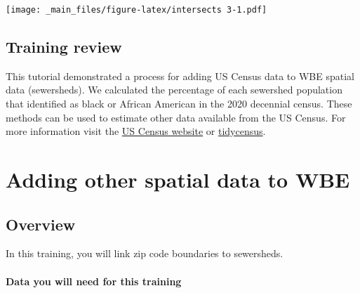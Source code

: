 \documentclass[
]{book}
\newenvironment{Shaded}{\begin{snugshade}}{\end{snugshade}}
\newcommand{\AttributeTok}[1]{\textcolor[rgb]{0.77,0.63,0.00}{#1}}
\newcommand{\CommentTok}[1]{\textcolor[rgb]{0.56,0.35,0.01}{\textit{#1}}}
\newcommand{\FunctionTok}[1]{\textcolor[rgb]{0.00,0.00,0.00}{#1}}
\newcommand{\NormalTok}[1]{#1}
\newcommand{\OtherTok}[1]{\textcolor[rgb]{0.56,0.35,0.01}{#1}}
\newcommand{\SpecialCharTok}[1]{\textcolor[rgb]{0.00,0.00,0.00}{#1}}
\newcommand{\StringTok}[1]{\textcolor[rgb]{0.31,0.60,0.02}{#1}}
\begin{document}
\begin{Shaded}
\end{Shaded}

\texttt{[image: \_main\_files/figure-latex/intersects 3-1.pdf]}

\hypertarget{training-review-1}{%
\section{Training review}\label{training-review-1}}

This tutorial demonstrated a process for adding US Census data to WBE spatial data (sewersheds). We calculated the percentage of each sewershed population that identified as black or African American in the 2020 decennial census. These methods can be used to estimate other data available from the US Census. For more information visit the \href{https://www.census.gov/}{US Census website} or \href{https://walker-data.com/tidycensus/}{tidycensus}.

\hypertarget{adding-other-spatial-data-to-wbe}{%
\chapter{Adding other spatial data to WBE}\label{adding-other-spatial-data-to-wbe}}

\hypertarget{overview-2}{%
\section{Overview}\label{overview-2}}

In this training, you will link zip code boundaries to sewersheds.

\hypertarget{data-you-will-need-for-this-training}{%
\subsubsection{Data you will need for this training}\label{data-you-will-need-for-this-training}}
\end{document}
